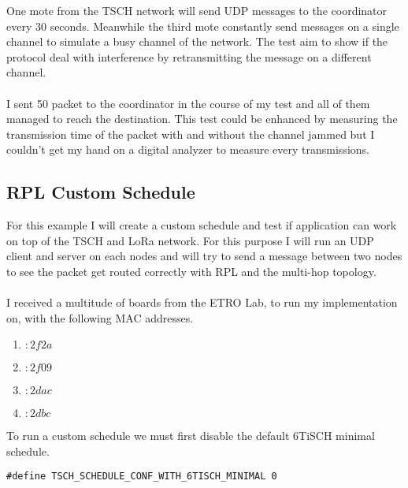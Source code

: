 

One mote from the TSCH network will send UDP messages to the coordinator
every 30 seconds.
Meanwhile the third mote constantly send messages on a single channel to
simulate a busy channel of the network.
The test aim to show if the protocol deal with interference by retransmitting 
the message on a different channel.

\paragraph{}

I sent 50 packet to the coordinator in the course of my test and all of them
managed to reach the destination.
This test could be enhanced by measuring the transmission time of the packet
with and without the channel jammed but I couldn't get my hand on a digital
analyzer to measure every transmissions.


\subsection{RPL Custom Schedule}

For this example I will create a custom schedule and test if application can
work on top of the TSCH and LoRa network.
For this purpose I will run an UDP client and server on each nodes and will try
to send a message between two nodes to see the packet get routed correctly with
RPL and the multi-hop topology.

\paragraph{}

I received a multitude of boards from the ETRO Lab, to run my
implementation on, with the following MAC addresses.

\begin{enumerate}
  \item $:2f2a$
  \item $:2f09$
  \item $:2dac$
  \item $:2dbc$
\end{enumerate}

To run a custom schedule we must first disable the default 6TiSCH minimal schedule.

\begin{lstlisting}
#define TSCH_SCHEDULE_CONF_WITH_6TISCH_MINIMAL 0
\end{lstlisting}

